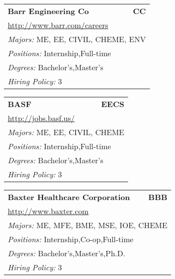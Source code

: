 \documentclass[twoside]{article}
\begin{document}
\begin{center}
\begin{multicols}{3}
\begin{FlushLeft}
\begin{minipage}{\columnwidth}
\end{minipage}
 
\begin{minipage}{\columnwidth}\begin{tabularx}{.95\columnwidth}{Xr}
                 {\Large\bf Barr Engineering Co} & {\Large\bf CC}\\
    \multicolumn{2}{p{.95\columnwidth}}{\url{http://www.barr.com/careers}}\\
    \multicolumn{2}{p{.95\columnwidth}}{\emph{Majors:} ME, EE, CIVIL, CHEME, ENV}\\
    \multicolumn{2}{p{.95\columnwidth}}{\emph{Positions:} Internship,Full-time}\\
    \multicolumn{2}{p{.95\columnwidth}}{\emph{Degrees:} Bachelor's,Master's}\\
    \multicolumn{2}{p{.95\columnwidth}}{\emph{Hiring Policy:} 3}\\
    \end{tabularx}
    
\end{minipage}
 
\begin{minipage}{\columnwidth}\begin{tabularx}{.95\columnwidth}{Xr}
                 {\Large\bf BASF} & {\Large\bf EECS}\\
    \multicolumn{2}{p{.95\columnwidth}}{\url{http://jobs.basf.us/}}\\
    \multicolumn{2}{p{.95\columnwidth}}{\emph{Majors:} ME, EE, CIVIL, CHEME}\\
    \multicolumn{2}{p{.95\columnwidth}}{\emph{Positions:} Internship,Full-time}\\
    \multicolumn{2}{p{.95\columnwidth}}{\emph{Degrees:} Bachelor's,Master's}\\
    \multicolumn{2}{p{.95\columnwidth}}{\emph{Hiring Policy:} 3}\\
    \end{tabularx}
    
\end{minipage}
 
\begin{minipage}{\columnwidth}\begin{tabularx}{.95\columnwidth}{Xr}
                 {\Large\bf Baxter Healthcare Corporation} & {\Large\bf BBB}\\
    \multicolumn{2}{p{.95\columnwidth}}{\url{http://www.baxter.com}}\\
    \multicolumn{2}{p{.95\columnwidth}}{\emph{Majors:} ME, MFE, BME, MSE, IOE, CHEME}\\
    \multicolumn{2}{p{.95\columnwidth}}{\emph{Positions:} Internship,Co-op,Full-time}\\
    \multicolumn{2}{p{.95\columnwidth}}{\emph{Degrees:} Bachelor's,Master's,Ph.D.}\\
    \multicolumn{2}{p{.95\columnwidth}}{\emph{Hiring Policy:} 3}\\
    \end{tabularx}
    

\end{minipage}
\end{FlushLeft}
\end{multicols}
\end{center}
\end{document}
